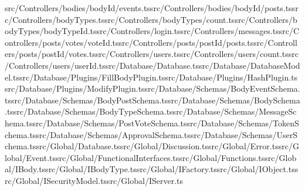 \documentclass[a4paper,12pt]{article}
\begin{document}
src/Controllers/bodies/{bodyId}/events.ts\newline src/Controllers/bodies/{bodyId}/posts.ts\newline src/Controllers/bodyTypes.ts\newline src/Controllers/bodyTypes/count.ts\newline src/Controllers/bodyTypes/{bodyTypeId}.ts\newline src/Controllers/login.ts\newline src/Controllers/messages.ts\newline src/Controllers/posts/votes/{voteId}.ts\newline src/Controllers/posts/{postId}/posts.ts\newline src/Controllers/posts/{postId}/votes.ts\newline src/Controllers/users.ts\newline src/Controllers/users/count.ts\newline src/Controllers/users/{userId}.ts\newline src/Database/Database.ts\newline src/Database/DatabaseModel.ts\newline src/Database/Plugins/FillBodyPlugin.ts\newline src/Database/Plugins/HashPlugin.ts\newline src/Database/Plugins/ModifyPlugin.ts\newline src/Database/Schemas/BodyEventSchema.ts\newline src/Database/Schemas/BodyPostSchema.ts\newline src/Database/Schemas/BodySchema.ts\newline src/Database/Schemas/BodyTypeSchema.ts\newline src/Database/Schemas/MessageSchema.ts\newline src/Database/Schemas/PostVoteSchema.ts\newline src/Database/Schemas/TokenSchema.ts\newline src/Database/Schemas/ApprovalSchema.ts\newline src/Database/Schemas/UserSchema.ts\newline src/Global/Database.ts\newline src/Global/Discussion.ts\newline src/Global/Error.ts\newline src/Global/Event.ts\newline src/Global/FunctionalInterfaces.ts\newline src/Global/Functions.ts\newline src/Global/IBody.ts\newline src/Global/IBodyType.ts\newline src/Global/IFactory.ts\newline src/Global/IObject.ts\newline src/Global/ISecurityModel.ts\newline src/Global/IServer.ts\newline 
\end{document}
